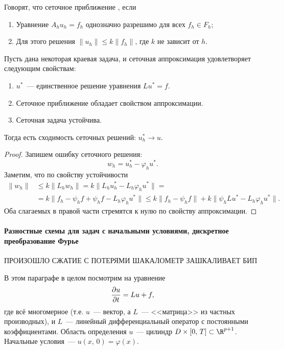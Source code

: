 \documentclass{trlnotes}
\begin{document}
\begin{de}  
	Говорят, что сеточное приближение , если
	\begin{enumerate}
		\item Уравнение $A_hu_h = f_h$ однозначно разрешимо для всех $f_h \in F_h$;
		\item Для этого решения $\|u_h\| \leqslant k \|f_h\|$, где $k$ не зависит от $h$.
	\end{enumerate}
\end{de}

\begin{thm}
	Пусть дана некоторая краевая задача, и сеточная аппроксимация удовлетворяет следующим свойствам:
	\begin{enumerate}
		\item $u^*$~--- единственное решение уравнения $Lu^* = f$.
		\item Сеточное приближение обладает свойством аппроксимации.
		\item Сеточная задача устойчива.
	\end{enumerate}
	Тогда есть сходимость сеточных решений: $u^*_h \to u$.
	\begin{proof}
		Запишем ошибку сеточного решения:
		\[
			w_h = u_h^* - \varphi_h u^*.
		\]
		Заметим, что по свойству устойчивости
		\begin{align*}
			\|w_h\| &\leqslant k \|L_h w_h\| = k\|L_h u_h^* - L_h \varphi_h u^*\| = \\ &= k\|f_h - \psi_h f + \psi_h f - L_h \varphi_h u^*\| \leqslant k\|f_h - \psi_h f\| + k\|\psi_h L u^* - L_h \varphi_h u^*\|.
		\end{align*}
		Оба слагаемых в правой части стремятся к нулю по свойству аппроксимации.
	\end{proof}
\end{thm}

\paragraph{Разностные схемы для задач с начальными условиями, дискретное преобразование Фурье}

\begin{rem}
	ПРОИЗОШЛО СЖАТИЕ С ПОТЕРЯМИ ШАКАЛОМЕТР ЗАШКАЛИВАЕТ БИП 
\end{rem}

В этом параграфе в целом посмотрим на уравнение 
\[
	\dfrac{\partial u}{\partial t} = Lu + f,
\]
где всё многомерное (т.е. $u$~--- вектор, а $L$~--- <<матрица>> из частных производных), и $L$~--- линейный дифференциальный оператор с постоянными коэффициентами. Область определения $u$~--- цилиндр $D\times [0, \, T] \subset \R^{p + 1}$. Начальные условия~--- $u(x, \, 0) = \varphi(x)$.
\end{document}
